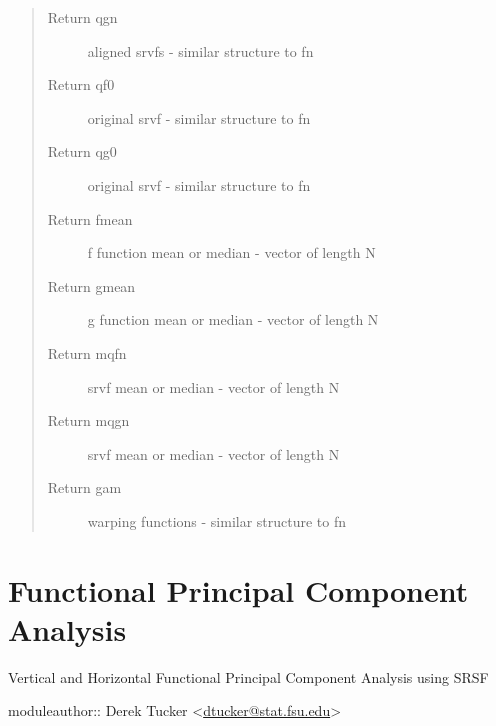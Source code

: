 \documentclass[letterpaper,10pt,english]{sphinxmanual}
\begin{document}
\begin{fulllineitems}
\begin{quote}
\begin{description}
\item[{Return qgn}] \leavevmode
aligned srvfs - similar structure to fn

\item[{Return qf0}] \leavevmode
original srvf - similar structure to fn

\item[{Return qg0}] \leavevmode
original srvf - similar structure to fn

\item[{Return fmean}] \leavevmode
f function mean or median - vector of length N

\item[{Return gmean}] \leavevmode
g function mean or median - vector of length N

\item[{Return mqfn}] \leavevmode
srvf mean or median - vector of length N

\item[{Return mqgn}] \leavevmode
srvf mean or median - vector of length N

\item[{Return gam}] \leavevmode
warping functions - similar structure to fn

\end{description}\end{quote}

\end{fulllineitems}



\chapter{Functional Principal Component Analysis}
\label{fPCA::doc}\label{fPCA:module-fPCA}\label{fPCA:functional-principal-component-analysis}
Vertical and Horizontal Functional Principal Component Analysis using SRSF

moduleauthor:: Derek Tucker \textless{}\href{mailto:dtucker@stat.fsu.edu}{dtucker@stat.fsu.edu}\textgreater{}
\end{document}
